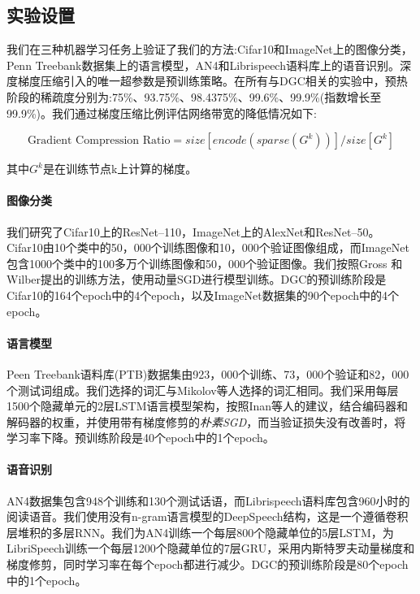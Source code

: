 \subsection{实验设置}
我们在三种机器学习任务上验证了我们的方法:Cifar10和ImageNet上的图像分类，Penn Treebank数据集上的语言模型，AN4和Librispeech语料库上的语音识别。深度梯度压缩引入的唯一超参数是预训练策略。在所有与DGC相关的实验中，预热阶段的稀疏度分别为:75\%、93.75\%、98.4375\%、99.6\%、99.9\%(指数增长至99.9\%)。我们通过梯度压缩比例评估网络带宽的降低情况如下:

\begin{equation*}
  \text{Gradient Compression Ratio} = size\left[encode\left(sparse({G}^k)\right)\right] / size\left[ G^k \right]
\end{equation*}

其中$G^k$是在训练节点k上计算的梯度。

\paragraph{图像分类}
我们研究了Cifar10上的ResNet--110，ImageNet上的AlexNet和ResNet--50。Cifar10由10个类中的50，000个训练图像和10，000个验证图像组成，而ImageNet包含1000个类中的100多万个训练图像和50，000个验证图像。我们按照Gross 和 Wilber提出的训练方法，使用动量SGD进行模型训练。DGC的预训练阶段是Cifar10的164个epoch中的4个epoch，以及ImageNet数据集的90个epoch中的4个epoch。

\paragraph{语言模型}
Peen Treebank语料库(PTB)数据集由923，000个训练、73，000个验证和82，000个测试词组成。我们选择的词汇与Mikolov等人选择的词汇相同。我们采用每层1500个隐藏单元的2层LSTM语言模型架构，按照Inan等人的建议，结合编码器和解码器的权重，并使用带有梯度修剪的\emph{朴素SGD}，而当验证损失没有改善时，将学习率下降。预训练阶段是40个epoch中的1个epoch。

\paragraph{语音识别}
AN4数据集包含948个训练和130个测试话语，而Librispeech语料库包含960小时的阅读语音。我们使用没有n-gram语言模型的DeepSpeech结构，这是一个遵循卷积层堆积的多层RNN。我们为AN4训练一个每层800个隐藏单位的5层LSTM，为LibriSpeech训练一个每层1200个隐藏单位的7层GRU，采用内斯特罗夫动量梯度和梯度修剪，同时学习率在每个epoch都进行减少。DGC的预训练阶段是80个epoch中的1个epoch。

